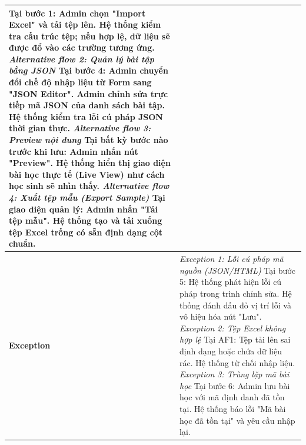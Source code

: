 \begin{longtable}{|l|p{}|}
	Tại bước 1: Admin chọn "Import Excel" và tải tệp lên. \newline
	Hệ thống kiểm tra cấu trúc tệp; nếu hợp lệ, dữ liệu sẽ được đổ vào các trường tương ứng. \newline\newline
	\textit{Alternative flow 2: Quản lý bài tập bằng JSON} \newline
	Tại bước 4: Admin chuyển đổi chế độ nhập liệu từ Form sang "JSON Editor". \newline
	Admin chỉnh sửa trực tiếp mã JSON của danh sách bài tập. \newline
	Hệ thống kiểm tra lỗi cú pháp JSON thời gian thực. \newline\newline
	\textit{Alternative flow 3: Preview nội dung} \newline
	Tại bất kỳ bước nào trước khi lưu: Admin nhấn nút "Preview". \newline
	Hệ thống hiển thị giao diện bài học thực tế (Live View) như cách học sinh sẽ nhìn thấy. \newline\newline
	\textit{Alternative flow 4: Xuất tệp mẫu (Export Sample)} \newline
	Tại giao diện quản lý: Admin nhấn "Tải tệp mẫu". \newline
	Hệ thống tạo và tải xuống tệp Excel trống có sẵn định dạng cột chuẩn. \\
	\hline
	\textbf{Exception} &
	\textit{Exception 1: Lỗi cú pháp mã nguồn (JSON/HTML)} \newline
	Tại bước 5: Hệ thống phát hiện lỗi cú pháp trong trình chỉnh sửa. \newline
	Hệ thống đánh dấu đỏ vị trí lỗi và vô hiệu hóa nút "Lưu". \newline\newline
	\textit{Exception 2: Tệp Excel không hợp lệ} \newline
	Tại AF1: Tệp tải lên sai định dạng hoặc chứa dữ liệu rác. \newline
	Hệ thống từ chối nhập liệu. \newline\newline
	\textit{Exception 3: Trùng lặp mã bài học} \newline
	Tại bước 6: Admin lưu bài học với mã định danh đã tồn tại. \newline
	Hệ thống báo lỗi "Mã bài học đã tồn tại" và yêu cầu nhập lại. \\
	\hline
\end{longtable}

